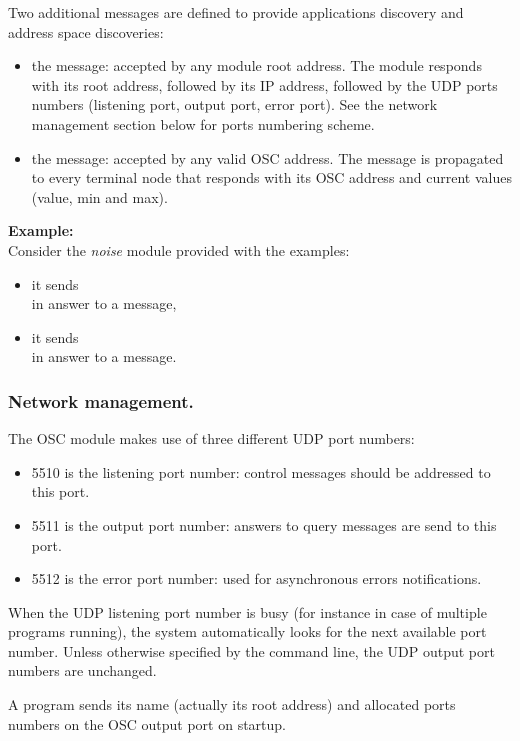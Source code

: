 Two additional messages are defined to provide \faust applications discovery and address space discoveries:
\begin{itemize}
\item the  message: accepted by any module root address. The module responds with its root address, followed by its IP address, followed by the UDP ports numbers (listening port, output port, error port).
See the network management section below for ports numbering scheme.
\item the  message: accepted by any valid OSC address. The  message is propagated to every terminal node that responds with its OSC address and current values (value, min and max).
\end{itemize}

\textbf{Example:} \\
Consider the \emph{noise} module provided with the \faust examples:
\begin{itemize}
\item it sends  \\in answer to a  message,
\item it sends  \\in answer to a  message.
\end{itemize}

 
\subsubsection{Network management.}
The OSC module makes use of three different UDP port numbers:
\begin{itemize}
\item 5510 is the listening port number: control messages should be addressed to this port.
\item 5511 is the output port number: answers to query messages are send to this port.
\item 5512 is the error port number: used for asynchronous errors notifications.
\end{itemize}

When the UDP listening port number is busy (for instance in case of multiple \faust programs running), the system automatically looks for the next available port number. Unless otherwise specified by the command line, the UDP output port numbers are unchanged. 

A program sends its name (actually its root address) and allocated ports numbers on the OSC output port on startup.

